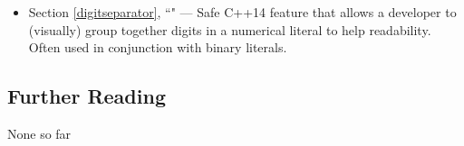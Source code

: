 \begin{itemize}
\item{Section \ref{digitseparator}, ``" — Safe C++14 feature that allows a developer to (visually) group together digits in a numerical literal to help readability. Often used in conjunction with binary literals.}
\end{itemize}

\subsection[Further Reading]{Further Reading}\label{further-reading}

None so far


